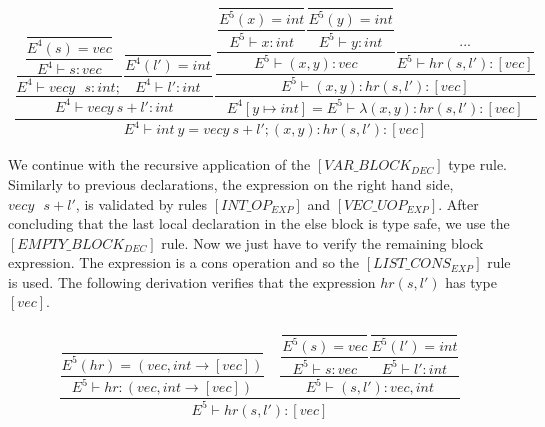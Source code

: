 \begin{align*}
    \dfrac
    {
        \dfrac
        {
            \dfrac
            {
                \dfrac
                {\dfrac{}{E^4(s) = vec}}
                {E^4 \vdash s \colon vec}
            }
            {E^4 \vdash vecy \text{ } s \colon int;} 
            \dfrac
            {\dfrac{}{E^4(l') = int}}
            {E^4 \vdash l' \colon int}}
        {E^4 \vdash vecy \: s + l' \colon int}
        \dfrac
        {
            \dfrac
            {
                \dfrac
                {
                    \dfrac
                    {\dfrac{}{E^5(x) = int}}
                    {E^5 \vdash x \colon int}
                    \dfrac
                    {\dfrac{}{E^5(y) = int}}
                    {E^5\vdash y \colon int}
                }
                {E^5 \vdash (x,y) \colon vec}
                \dfrac
                {...}
                {E^5 \vdash hr(s,l') \colon [vec]}
            }
            {E^5 \vdash (x,y) \colon hr (s, l') \colon [vec]}
        }
        {E^4[y \longmapsto int] = E^5 \vdash \lambda (x,y) \colon hr (s, l') \colon [vec]}
    }
    {E^4 \vdash int \: y = vecy \: s + l'; (x, y) \colon hr(s, l') \colon [vec]}
\end{align*}

\newblock
\par
We continue with the recursive application of the $[VAR\_BLOCK_{DEC}]$ type rule. Similarly to previous declarations, the expression on the right hand side, $vecy \text{ } s + l'$, is validated by rules $[INT\_OP_{EXP}]$ and $[VEC\_UOP_{EXP}]$. After concluding that the last local declaration in the else block is type safe, we use the $[EMPTY\_BLOCK_{DEC}]$ rule. Now we just have to verify the remaining block expression. The expression is a cons operation and so the $[LIST\_CONS_{EXP}]$ rule is used. The following derivation verifies that the expression $hr(s,l')$ has type $[vec]$.

\begin{align*}
    \dfrac
    {
        \dfrac
        {\dfrac{}{E^5(hr) = (vec,int \rightarrow [vec])}}
        {E^5 \vdash hr \colon (vec,int \rightarrow [vec])}
        \quad
        \dfrac
        {
            \dfrac
            {\dfrac{}{E^5(s) = vec}}
            {E^5 \vdash s \colon vec}
            \dfrac
            {\dfrac{}{E^5(l') = int}}
            {E^5 \vdash l' \colon int}
        }
        {E^5 \vdash (s,l') \colon vec,int}
    }
    {E^5 \vdash hr(s,l') \colon [vec]}
\end{align*}

